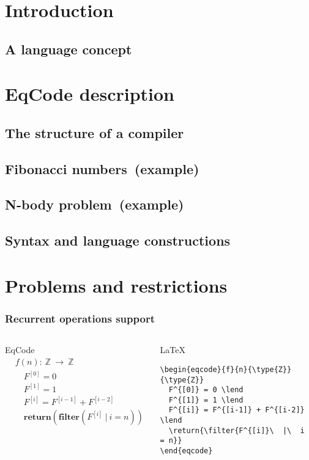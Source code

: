 \documentclass[xcolor=dvipsnames,mathserif,professionalfont,12pt]{beamer}
\begin{document}
\section{Introduction}
\subsection{A language concept}
\section{EqCode description}
\subsection{The structure of a compiler}
\subsection{Fibonacci numbers\  (example)}
\subsection{N-body problem\ (example)}
\subsection{Syntax and language constructions}
\section{Problems and restrictions}

\begin{frame}[fragile]
  \frametitle{Recurrent operations support}
  \begin{columns}[t]
    \begin{block}{EqCode}
      \begin{align*}
& f(n):\  \mathbb{Z}\  \rightarrow\  \mathbb{Z} \\
& \quad F^{[0]} = 0 \\
& \quad F^{[1]} = 1 \\
& \quad F^{[i]} = F^{[i-1]} + F^{[i-2]} \\
& \quad {\textbf {return}}({\textbf {filter}}(F^{[i]}\  |\  i = n))
      \end{align*}
    \end{block}
      \begin{block}{\LaTeX}
      \begin{lstlisting}
\begin{eqcode}{f}{n}{\type{Z}}{\type{Z}}
  F^{[0]} = 0 \lend
  F^{[1]} = 1 \lend
  F^{[i]} = F^{[i-1]} + F^{[i-2]} \lend
  \return{\filter{F^{[i]}\  |\  i = n}}
\end{eqcode}
      \end{lstlisting}
      \end{block}
  \end{columns}
\end{frame}
\end{document}

